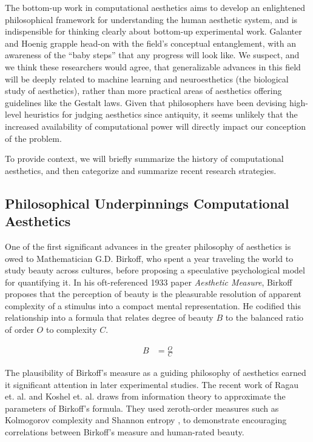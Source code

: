 \documentclass[midd]{thesis}
\begin{document}

The bottom-up work in computational aesthetics aims to develop an enlightened philosophical framework for understanding the human aesthetic system, and is indispensible for thinking clearly about bottom-up experimental work. Galanter and Hoenig grapple head-on with the field's conceptual entanglement, with an awareness of the ``baby steps'' that any progress will look like. We suspect, and we think these researchers would agree, that generalizable advances in this field will be deeply related to machine learning and neuroesthetics (the biological study of aesthetics), rather than more practical areas of aesthetics offering guidelines like the Gestalt laws. Given that philosophers have been devising high-level heuristics for judging aesthetics since antiquity, it seems unlikely that the increased availability of computational power will directly impact our conception of the problem.

To provide context, we will briefly summarize the history of computational aesthetics, and then categorize and summarize recent research strategies.

\subsection{Philosophical Underpinnings Computational Aesthetics}

One of the first significant advances in the greater philosophy of aesthetics is owed to Mathematician G.D. Birkoff, who spent a year traveling the world to study beauty across cultures, before proposing a speculative psychological model for quantifying it. In his oft-referenced 1933 paper \emph{Aesthetic Measure}, Birkoff proposes that the perception of beauty is the pleasurable resolution of apparent complexity of a stimulus into a compact mental representation. He codified this relationship into a formula that relates degree of beauty $B$ to the balanced ratio of order $O$ to complexity $C$.

\begin{align*}
B &= \frac{O}{C}
\end{align*}

The plausibility of Birkoff's measure as a guiding philosophy of aesthetics earned it significant attention in later experimental studies. The recent work of Ragau et. al. and Koshel et. al. draws from information theory to approximate the parameters of Birkoff's formula. They used zeroth-order measures such as Kolmogorov complexity and Shannon entropy \cite{rigau-1, koshelev-1}, to demonstrate encouraging correlations between Birkoff's measure and human-rated beauty.
\end{document}
